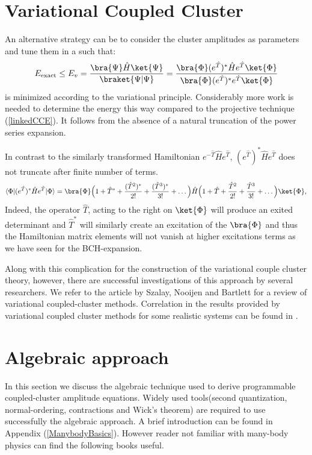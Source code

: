 \documentclass[twoside,english]{uiofysmaster}
\begin{document}
\section{Variational Coupled Cluster}

An alternative strategy can be to consider the cluster amplitudes as parameters and tune them in a such that:
\[
E_{\text{exact}} \le E_v = \frac{\bra{\Psi}\hat{H}\ket{\Psi}}{\braket{\Psi|\Psi}} =\frac{\bra{\Phi}(e^{\hat{T}})^*\hat{H}e^{\hat{T}}\ket{\Phi}}{\bra{\Phi}(e^{\hat{T}})^* e^{\hat{T}}\ket{\Phi}}
\]
is minimized according to the variational principle. Considerably more work is needed to determine the energy this way compared to the projective technique (\ref{linkedCCE}). It follows from the absence of a natural truncation of the power series expansion. 

In contrast to the similarly transformed Hamiltonian $e^{-\hat{T}}\hat{H}e^{\hat{T}}$, $(e^{\hat{T}})^*\hat{H}e^{\hat{T}}$ does not truncate after finite number of terms.
\[
\langle\Phi|(e^{\hat{T}})^*\hat{H}e^{\hat{T}}|\Phi\rangle = \bra{\Phi}\Big(1 + \hat{T}^* + \frac{(\hat{T}^2)^*}{2!} + \frac{(\hat{T}^3)^*}{3!} + \dots  \Big)\hat{H}\Big(1 + \hat{T} + \frac{\hat{T}^2}{2!} + \frac{\hat{T}^3}{3!} + \dots  \Big)\ket{\Phi},
\]
Indeed, the operator $\hat{T}$, acting to the right on $\ket{\Phi}$ will produce an exited determinant and $\hat{T}^*$ will similarly create an excitation of the $\bra{\Phi}$ and thus the Hamiltonian matrix elements will not vanish at higher excitations terms as we have seen for the BCH-expansion.

Along with this complication for the construction of the variational couple cluster theory, however, there are successful investigations of this approach by several researchers. We refer to the article by Szalay, Nooijen and Bartlett \cite{SzalayAlternativeansatzesingle1995} for a review of variational coupled-cluster methods. Correlation in the results provided by variational coupled cluster methods for some realistic systems can be found in \cite{EvangelistaAlternativesinglereferencecoupled2011}.


\section{Algebraic approach}

In this section we discuss the algebraic technique used to derive programmable coupled-cluster amplitude equations. Widely used tools(second quantization, normal-ordering, contractions and Wick's theorem) are required to use successfully the algebraic approach. A brief introduction can be found in Appendix (\ref{ManybodyBasics}). However reader not familiar with many-body physics can find the following books \cite{HarrisAlgebraicdiagrammaticmethods1992} \cite{CrawfordIntroductionCoupledCluster2007} \cite{GrossManyparticletheory1991}  \cite{SzaboModernQuantumChemistry1996} \cite{RaimesManyelectrontheory1972} useful.
\end{document}
